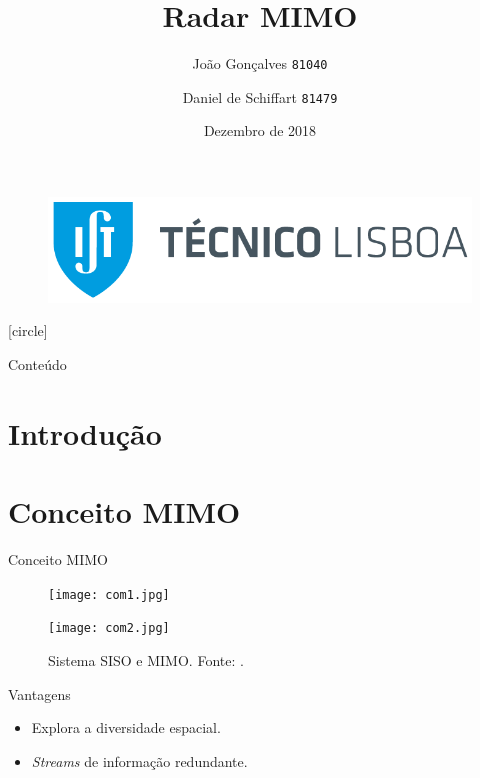 \documentclass[portuguese]{beamer}
\title[Radar MIMO]{Radar MIMO}
\author[MEAer -- Sistemas de Radar]{
  João Gonçalves \texttt{81040} \and Daniel de Schiffart \texttt{81479} 
    }
\institute{Sistemas de Radar}
\date{Dezembro de 2018}
\begin{document}
\begin{frame}
    \begin{figure}
	\includegraphics[width=0.5\linewidth]{graphics/tecnico_logo.png}
    \end{figure}
    \titlepage
\end{frame}
[circle]
\begin{frame}{Conteúdo}
  \tableofcontents
\end{frame}

\section{Introdução}

\section{Conceito MIMO}

\begin{frame}{Conceito MIMO}
  \begin{figure}[]
	\centering
	\begin{minipage}[t]{0.5\linewidth}
	  \centering
	  \texttt{[image: com1.jpg]}
    \end{minipage}%
    \begin{minipage}[t]{0.5\linewidth}	
	  \centering
	  \texttt{[image: com2.jpg]}
    \end{minipage}%
	\caption{Sistema SISO e MIMO. Fonte: \cite{swantennas}.}
	\label{fig:antenas}
  \end{figure}
  Vantagens
  \begin{itemize}
	\item Explora a diversidade espacial.
	\item \textit{Streams} de informação redundante.
  \end{itemize}
\end{frame}
\end{document}
